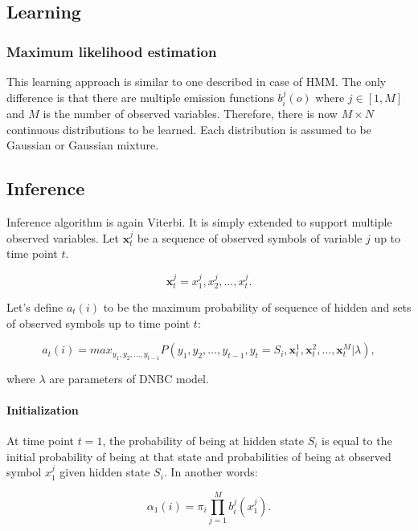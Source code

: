 \documentclass[thesis=B,english]{FITthesis}[2012/06/26]
\begin{document}
\subsection{Learning}

\subsubsection{Maximum likelihood estimation}

This learning approach is similar to one described in case of HMM. The only difference is that there are multiple emission functions $b^j_i(o)$ where $j \in [1,M]$ and $M$ is the number of observed variables. Therefore, there is now $M \times N$ continuous distributions to be learned. Each distribution is assumed to be Gaussian or Gaussian mixture.

\subsection{Inference}

Inference algorithm is again Viterbi. It is simply extended to support multiple observed variables. Let $\textbf{x}_t^j$ be a sequence of observed symbols of variable $j$ up to time point $t$.

\begin{equation}
\textbf{x}_t^j = x_1^j,x_2^j,\dots,x_t^j.
\end{equation}

Let's define $a_t(i)$ to be the maximum probability of sequence of hidden and sets of observed symbols up to time point $t$:

\begin{equation} \label{eq:dnbc_viterbi_a}
a_t(i) = max_{y_1,y_2,\dots,y_{t-1}} P(y_1,y_2,\dots,y_{t-1},y_t = S_i,\textbf{x}_t^1,\textbf{x}_t^2,\dots,\textbf{x}_t^M| \lambda),
\end{equation}

where $\lambda$ are parameters of DNBC model.

\paragraph{Initialization}

At time point $t=1$, the probability of being at hidden state $S_i$ is equal to the initial probability of being at that state and probabilities of being at observed symbol $x_1^j$ given hidden state $S_i$. In another words:

\begin{equation}
\alpha_1(i) = \pi_i \prod_{j=1}^M b^j_i(x^j_1).
\end{equation}
\end{document}
